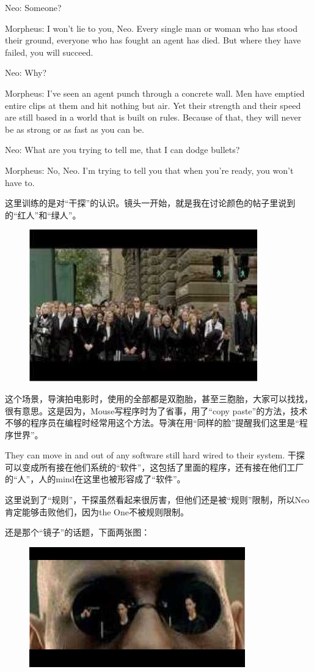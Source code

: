 \documentclass{ctexart}
\newenvironment{myquote}{\color{green} \setlength{\leftskip}{6em} \setlength{\rightskip}{4em} \setlength{\parindent}{-2em}}{\par}
\begin{document}
\begin{myquote}
Neo: Someone?

Morpheus: I won't lie to you, Neo. Every single man or woman who has stood their ground, everyone who has fought an agent has died. But where they have failed, you will succeed.

Neo: Why?

Morpheus: I've seen an agent punch through a concrete wall. Men have emptied entire clips at them and hit nothing but air. Yet their strength and their speed are still based in a world that is built on rules. Because of that, they will never be as strong or as fast as you can be.

Neo: What are you trying to tell me, that I can dodge bullets?

Morpheus: No, Neo. I'm trying to tell you that when you're ready, you won't have to.
\end{myquote}

这里训练的是对“干探”的认识。镜头一开始，就是我在讨论颜色的帖子里说到的“红人”和“绿人”。

\begin{figure}[htb]
\centering
\includegraphics[width=0.5\linewidth]{fig/read_Matrix-33-1}
\end{figure}

这个场景，导演拍电影时，使用的全部都是双胞胎，甚至三胞胎，大家可以找找，很有意思。这是因为，Mouse写程序时为了省事，用了“copy paste”的方法，技术不够的程序员在编程时经常用这个方法。导演在用“同样的脸”提醒我们这里是“程序世界”。

They can move in and out of any software still hard wired to their system. 干探可以变成所有接在他们系统的“软件”，这包括了里面的程序，还有接在他们工厂的“人”，人的mind在这里也被形容成了“软件”。

这里说到了“规则”，干探虽然看起来很厉害，但他们还是被“规则”限制，所以Neo肯定能够击败他们，因为the One不被规则限制。

还是那个“镜子”的话题，下面两张图：

\begin{figure}[htb]
\centering
\includegraphics[width=0.5\linewidth]{fig/read_Matrix-34}
\end{figure}
\end{document}
